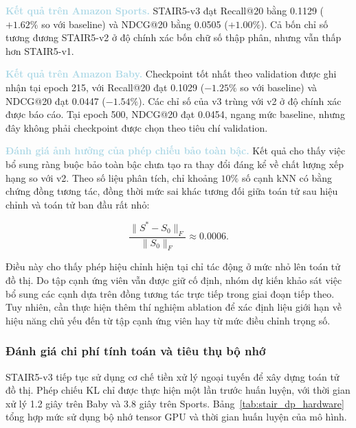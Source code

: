 \noindent\textcolor{lightblue}{\textbf{Kết quả trên Amazon Sports.}} STAIR5-v3 đạt Recall@20 bằng 0.1129 ($+1.62\%$ so với baseline) và NDCG@20 bằng 0.0505 ($+1.00\%$). Cả bốn chỉ số tương đương STAIR5-v2 ở độ chính xác bốn chữ số thập phân, nhưng vẫn thấp hơn STAIR5-v1.

\noindent\textcolor{lightblue}{\textbf{Kết quả trên Amazon Baby.}} Checkpoint tốt nhất theo validation được ghi nhận tại epoch 215, với Recall@20 đạt 0.1029 ($-1.25\%$ so với baseline) và NDCG@20 đạt 0.0447 ($-1.54\%$). Các chỉ số của v3 trùng với v2 ở độ chính xác được báo cáo. Tại epoch 500, NDCG@20 đạt 0.0454, ngang mức baseline, nhưng đây không phải checkpoint được chọn theo tiêu chí validation.

\noindent\textcolor{lightblue}{\textbf{Đánh giá ảnh hưởng của phép chiếu bảo toàn bậc.}} Kết quả cho thấy việc bổ sung ràng buộc bảo toàn bậc chưa tạo ra thay đổi đáng kể về chất lượng xếp hạng so với v2. Theo số liệu phân tích, chỉ khoảng $10\%$ số cạnh kNN có bằng chứng đồng tương tác, đồng thời mức sai khác tương đối giữa toán tử sau hiệu chỉnh và toán tử ban đầu rất nhỏ:

\begin{equation}
\frac{\lVert S^{*}-S_0\rVert_F}{\lVert S_0\rVert_F}\approx 0.0006.
\end{equation}

Điều này cho thấy phép hiệu chỉnh hiện tại chỉ tác động ở mức nhỏ lên toán tử đồ thị. Do tập cạnh ứng viên vẫn được giữ cố định, nhóm dự kiến khảo sát việc bổ sung các cạnh dựa trên đồng tương tác trực tiếp trong giai đoạn tiếp theo. Tuy nhiên, cần thực hiện thêm thí nghiệm ablation để xác định liệu giới hạn về hiệu năng chủ yếu đến từ tập cạnh ứng viên hay từ mức điều chỉnh trọng số.



\subsubsection{Đánh giá chi phí tính toán và tiêu thụ bộ nhớ}

STAIR5-v3 tiếp tục sử dụng cơ chế tiền xử lý ngoại tuyến để xây dựng toán tử đồ thị. Phép chiếu KL chỉ được thực hiện một lần trước huấn luyện, với thời gian xử lý 1.2 giây trên Baby và 3.8 giây trên Sports. Bảng~\ref{tab:stair_dp_hardware} tổng hợp mức sử dụng bộ nhớ tensor GPU và thời gian huấn luyện của mô hình.


